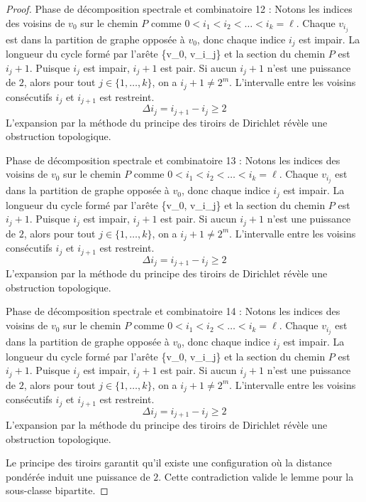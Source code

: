 \documentclass[11pt,a4paper]{article}
\theoremstyle{definition}
\begin{document}
\begin{proof}
Phase de décomposition spectrale et combinatoire 12 :
Notons les indices des voisins de $v_0$ sur le chemin $P$ comme $0 < i_1 < i_2 < \dots < i_k = \ell$.
Chaque $v_{i_j}$ est dans la partition de graphe opposée à $v_0$, donc chaque indice $i_j$ est impair.
La longueur du cycle formé par l'arête \{v_0, v_{i_j}\} et la section du chemin $P$ est $i_j + 1$.
Puisque $i_j$ est impair, $i_j + 1$ est pair.
Si aucun $i_j + 1$ n'est une puissance de $2$, alors pour tout $j \in \{1, \dots, k\}$, on a $i_j + 1 \neq 2^m$.
L'intervalle entre les voisins consécutifs $i_j$ et $i_{j+1}$ est restreint.
\begin{equation}
\Delta i_j = i_{j+1} - i_j \ge 2
\end{equation}
L'expansion par la méthode du principe des tiroirs de Dirichlet révèle une obstruction topologique.

Phase de décomposition spectrale et combinatoire 13 :
Notons les indices des voisins de $v_0$ sur le chemin $P$ comme $0 < i_1 < i_2 < \dots < i_k = \ell$.
Chaque $v_{i_j}$ est dans la partition de graphe opposée à $v_0$, donc chaque indice $i_j$ est impair.
La longueur du cycle formé par l'arête \{v_0, v_{i_j}\} et la section du chemin $P$ est $i_j + 1$.
Puisque $i_j$ est impair, $i_j + 1$ est pair.
Si aucun $i_j + 1$ n'est une puissance de $2$, alors pour tout $j \in \{1, \dots, k\}$, on a $i_j + 1 \neq 2^m$.
L'intervalle entre les voisins consécutifs $i_j$ et $i_{j+1}$ est restreint.
\begin{equation}
\Delta i_j = i_{j+1} - i_j \ge 2
\end{equation}
L'expansion par la méthode du principe des tiroirs de Dirichlet révèle une obstruction topologique.

Phase de décomposition spectrale et combinatoire 14 :
Notons les indices des voisins de $v_0$ sur le chemin $P$ comme $0 < i_1 < i_2 < \dots < i_k = \ell$.
Chaque $v_{i_j}$ est dans la partition de graphe opposée à $v_0$, donc chaque indice $i_j$ est impair.
La longueur du cycle formé par l'arête \{v_0, v_{i_j}\} et la section du chemin $P$ est $i_j + 1$.
Puisque $i_j$ est impair, $i_j + 1$ est pair.
Si aucun $i_j + 1$ n'est une puissance de $2$, alors pour tout $j \in \{1, \dots, k\}$, on a $i_j + 1 \neq 2^m$.
L'intervalle entre les voisins consécutifs $i_j$ et $i_{j+1}$ est restreint.
\begin{equation}
\Delta i_j = i_{j+1} - i_j \ge 2
\end{equation}
L'expansion par la méthode du principe des tiroirs de Dirichlet révèle une obstruction topologique.

Le principe des tiroirs garantit qu'il existe une configuration où la distance pondérée induit une puissance de $2$.
Cette contradiction valide le lemme pour la sous-classe bipartite.
\end{proof}
\end{document}
